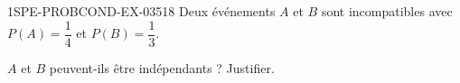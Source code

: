 \begin{exercice}{1SPE-PROBCOND-EX-035}{1}{8}
Deux événements $A$ et $B$ sont incompatibles avec $P(A) = \dfrac{1}{4}$ et $P(B) = \dfrac{1}{3}$.

$A$ et $B$ peuvent-ils être indépendants ? Justifier.
\end{exercice}
